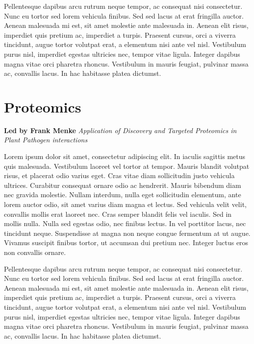 \documentclass[12pt,]{book}
\begin{document}
Pellentesque dapibus arcu rutrum neque tempor, ac consequat nisi
consectetur. Nunc eu tortor sed lorem vehicula finibus. Sed sed lacus at
erat fringilla auctor. Aenean malesuada mi est, sit amet molestie ante
malesuada in. Aenean elit risus, imperdiet quis pretium ac, imperdiet a
turpis. Praesent cursus, orci a viverra tincidunt, augue tortor volutpat
erat, a elementum nisi ante vel nisl. Vestibulum purus nisl, imperdiet
egestas ultricies nec, tempor vitae ligula. Integer dapibus magna vitae
orci pharetra rhoncus. Vestibulum in mauris feugiat, pulvinar massa ac,
convallis lacus. In hac habitasse platea dictumst.

\chapter*{Proteomics}\label{proteomics}

\textbf{Led by Frank Menke} \emph{Application of Discovery and Targeted
Proteomics in Plant Pathogen interactions}

Lorem ipsum dolor sit amet, consectetur adipiscing elit. In iaculis
sagittis metus quis malesuada. Vestibulum laoreet vel tortor at tempor.
Mauris blandit volutpat risus, et placerat odio varius eget. Cras vitae
diam sollicitudin justo vehicula ultrices. Curabitur consequat ornare
odio ac hendrerit. Mauris bibendum diam nec gravida molestie. Nullam
interdum, nulla eget sollicitudin elementum, ante lorem auctor odio, sit
amet varius diam magna et lectus. Sed vehicula velit velit, convallis
mollis erat laoreet nec. Cras semper blandit felis vel iaculis. Sed in
mollis nulla. Nulla sed egestas odio, nec finibus lectus. In vel
porttitor lacus, nec tincidunt neque. Suspendisse at magna non neque
congue fermentum at ut augue. Vivamus suscipit finibus tortor, ut
accumsan dui pretium nec. Integer luctus eros non convallis ornare.

Pellentesque dapibus arcu rutrum neque tempor, ac consequat nisi
consectetur. Nunc eu tortor sed lorem vehicula finibus. Sed sed lacus at
erat fringilla auctor. Aenean malesuada mi est, sit amet molestie ante
malesuada in. Aenean elit risus, imperdiet quis pretium ac, imperdiet a
turpis. Praesent cursus, orci a viverra tincidunt, augue tortor volutpat
erat, a elementum nisi ante vel nisl. Vestibulum purus nisl, imperdiet
egestas ultricies nec, tempor vitae ligula. Integer dapibus magna vitae
orci pharetra rhoncus. Vestibulum in mauris feugiat, pulvinar massa ac,
convallis lacus. In hac habitasse platea dictumst.
\end{document}
